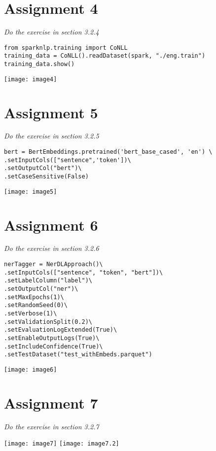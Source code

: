 \documentclass[]{article}
\begin{document}
\section*{Assignment 4}
\emph{ Do the exercise in section 3.2.4 }

\begin{verbatim}
from sparknlp.training import CoNLL
training_data = CoNLL().readDataset(spark, "./eng.train")
training_data.show()
\end{verbatim}
\texttt{[image: image4]} %


\section*{Assignment 5}
\emph{ Do the exercise in section 3.2.5 }

\begin{verbatim}
bert = BertEmbeddings.pretrained('bert_base_cased', 'en') \
.setInputCols(["sentence",'token'])\
.setOutputCol("bert")\
.setCaseSensitive(False)
\end{verbatim}
\texttt{[image: image5]} %


\section*{Assignment 6}
\emph{ Do the exercise in section 3.2.6 }

\begin{verbatim}
nerTagger = NerDLApproach()\
.setInputCols(["sentence", "token", "bert"])\
.setLabelColumn("label")\
.setOutputCol("ner")\
.setMaxEpochs(1)\
.setRandomSeed(0)\
.setVerbose(1)\
.setValidationSplit(0.2)\
.setEvaluationLogExtended(True)\
.setEnableOutputLogs(True)\
.setIncludeConfidence(True)\
.setTestDataset("test_withEmbeds.parquet")
\end{verbatim}
\texttt{[image: image6]} %


\section*{Assignment 7}
\emph{ Do the exercise in section 3.2.7 }

\texttt{[image: image7]} %
\texttt{[image: image7.2]} %
\end{document}
